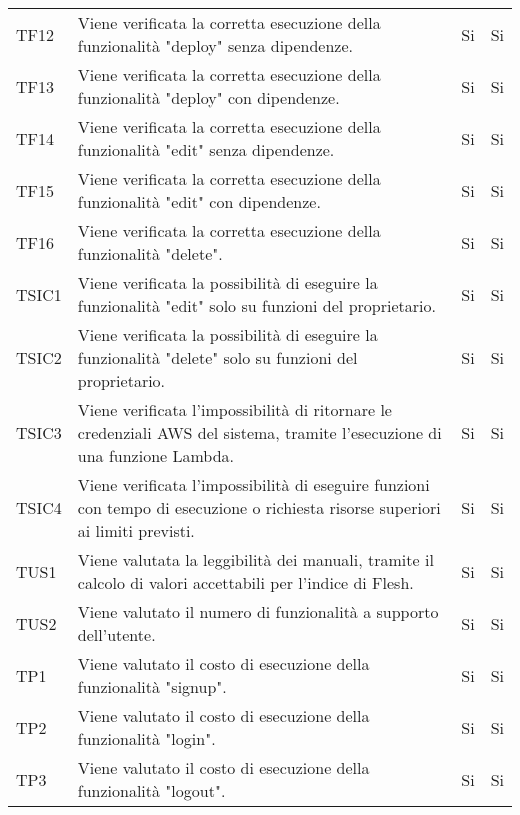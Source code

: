 \begin{longtable}{
		>{\centering}p{}
		>{}p{}
		>{\centering}p{}
		>{\centering}p{} }
		TF12 & Viene verificata la corretta esecuzione della funzionalità "deploy\ped{\textit{G}}" senza dipendenze. &
		Si &
		Si \tabularnewline
		
		TF13 & Viene verificata la corretta esecuzione della funzionalità "deploy\ped{\textit{G}}" con dipendenze. &
		Si &
		Si \tabularnewline
		
		TF14 & Viene verificata la corretta esecuzione della funzionalità "edit" senza dipendenze. &
		Si &
		Si \tabularnewline
		
		TF15 & Viene verificata la corretta esecuzione della funzionalità "edit" con dipendenze. &
		Si &
		Si \tabularnewline
		
		TF16 & Viene verificata la corretta esecuzione della funzionalità "delete". &
		Si &
		Si \tabularnewline
		
		
		
		
		TSIC1 & Viene verificata la possibilità di eseguire la funzionalità "edit" solo su funzioni del proprietario. &
		Si &
		Si \tabularnewline
		
		TSIC2 & Viene verificata la possibilità di eseguire la funzionalità "delete" solo su funzioni del proprietario. &
		Si &
		Si \tabularnewline
		
		TSIC3 & Viene verificata l'impossibilità di ritornare le credenziali AWS\ped{\textit{G}} del sistema, tramite l'esecuzione di una funzione Lambda\ped{\textit{G}}. &
		Si &
		Si \tabularnewline
		
		TSIC4 & Viene verificata l'impossibilità di eseguire funzioni con tempo di esecuzione o richiesta risorse superiori ai limiti previsti.  &
		Si &
		Si \tabularnewline
		
		
		
		
		
		
		TUS1 & Viene valutata la leggibilità dei manuali, tramite il calcolo di valori accettabili per l'indice di Flesh. &
		Si &
		Si \tabularnewline
		
		TUS2 & Viene valutato il numero di funzionalità a supporto dell'utente. &
		Si &
		Si \tabularnewline




		TP1 & Viene valutato il costo di esecuzione della funzionalità "signup". &
		Si &
		Si \tabularnewline
		
		TP2 & Viene valutato il costo di esecuzione della funzionalità "login". &
		Si &
		Si \tabularnewline
		
		TP3 & Viene valutato il costo di esecuzione della funzionalità "logout". &
		Si &
		Si \tabularnewline
		

\end{longtable}
